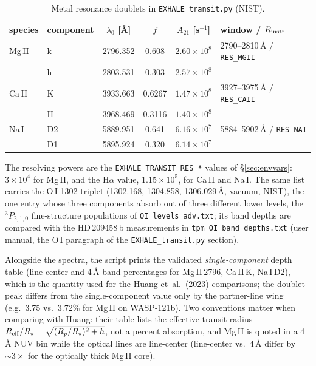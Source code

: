 \documentclass[english,a4paper]{my_memo}
\begin{document}
\begin{table}[htbp]
\centering\small
\caption{Metal resonance doublets in \texttt{EXHALE\_transit.py} (NIST).}
\label{tab:metal-lines}
\begin{tabular}{llcccl}
\toprule
species & component & $\lambda_0$ [\AA{}] & $f$ & $A_{21}$ [s$^{-1}$] & window / $R_{\rm instr}$ \\
\midrule
Mg\,II & k & 2796.352 & 0.608 & $2.60\times10^8$ &
  2790--2810\,\AA{} / \texttt{RES\_MGII} \\
       & h & 2803.531 & 0.303 & $2.57\times10^8$ & \\
Ca\,II & K & 3933.663 & 0.6267 & $1.47\times10^8$ &
  3927--3975\,\AA{} / \texttt{RES\_CAII} \\
       & H & 3968.469 & 0.3116 & $1.40\times10^8$ & \\
Na\,I  & D2 & 5889.951 & 0.641 & $6.16\times10^7$ &
  5884--5902\,\AA{} / \texttt{RES\_NAI} \\
       & D1 & 5895.924 & 0.320 & $6.14\times10^7$ & \\
\bottomrule
\end{tabular}
\end{table}

\noindent The resolving powers are the \texttt{EXHALE\_TRANSIT\_RES\_*}
values of \S\ref{sec:envvars}: $3\times10^4$ for Mg\,II, and the H$\alpha$
value, $1.15\times10^5$, for Ca\,II and Na\,I. The same list carries the
O\,I 1302 triplet (1302.168, 1304.858, 1306.029\,\AA{}, vacuum, NIST), the
one entry whose three components absorb out of three different lower levels,
the $^3P_{2,1,0}$ fine-structure populations of \texttt{OI\_levels\_adv.txt};
its band depths are compared with the HD\,209458\,b measurements in
\texttt{tpm\_OI\_band\_depths.txt} (user manual, the O\,I paragraph of the
\texttt{EXHALE\_transit.py} section).

Alongside the spectra, the script prints the validated
\emph{single-component} depth table (line-center and 4\,\AA{}-band
percentages for Mg\,II\,2796, Ca\,II\,K, Na\,I\,D2), which is the
quantity used for the Huang et~al.~(2023) comparisons; the doublet peak
differs from the single-component value only by the partner-line wing
(e.g.\ 3.75 vs.\ 3.72\% for Mg\,II on WASP-121b). Two conventions
matter when comparing with Huang: their table lists the effective
transit radius $R_{\rm eff}/R_\star=\sqrt{(R_p/R_\star)^2+h}$, not a
percent absorption, and Mg\,II is quoted in a 4\,\AA{} NUV bin while the
optical lines are line-center (line-center vs.\ 4\,\AA{} differ by
$\sim3\times$ for the optically thick Mg\,II core).
\end{document}
